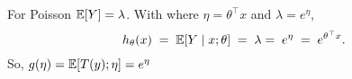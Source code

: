 \begin{answer}

For Poisson $\mathbb{E}[Y]=\lambda$. With
where $\eta=\theta^\top x$ and $\lambda=e^{\eta}$,
\[
h_\theta(x)\;=\;\mathbb{E}[Y\mid x ; \theta]\;=\;\lambda=\;e^{\eta}\;=\;e^{\theta^\top x}.
\]
So, $g(\eta) = \mathbb{E}[T(y); \eta] =  e^\eta$

\end{answer}
